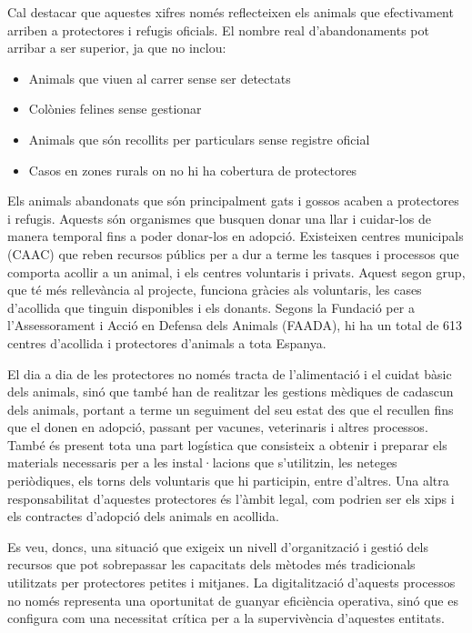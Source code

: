 \documentclass[11pt,a4paper]{report}
\begin{document}
Cal destacar que aquestes xifres només reflecteixen els animals que efectivament arriben a protectores i refugis oficials. El nombre real d'abandonaments pot arribar a ser superior, ja que no inclou:

\begin{itemize}
    \item Animals que viuen al carrer sense ser detectats
    
    \item Colònies felines sense gestionar

    \item Animals que són recollits per particulars sense registre oficial
    
    \item Casos en zones rurals on no hi ha cobertura de protectores
\end{itemize}

Els animals abandonats que són principalment gats i gossos acaben a protectores i refugis. Aquests són organismes que busquen donar una llar i cuidar-los de manera temporal fins a poder donar-los en adopció. Existeixen centres municipals (CAAC) que reben recursos públics per a dur a terme les tasques i processos que comporta acollir a un animal, i els centres voluntaris i privats. Aquest segon grup, que té més rellevància al projecte, funciona gràcies als voluntaris, les cases d’acollida que tinguin disponibles i els donants. Segons la Fundació per a l'Assessorament i Acció en Defensa dels Animals (FAADA), hi ha un total de 613 centres d’acollida i protectores d’animals \cite{faada_protectoras_nodate} a tota Espanya.

El dia a dia de les protectores no només tracta de l’alimentació i el cuidat bàsic dels animals, sinó que també han de realitzar les gestions mèdiques de cadascun dels animals, portant a terme un seguiment del seu estat des que el recullen fins que el donen en adopció, passant per vacunes, veterinaris i altres processos. També és present tota una part logística que consisteix a obtenir i preparar els materials necessaris per a les instal·lacions que s’utilitzin, les neteges periòdiques, els torns dels voluntaris que hi participin, entre d’altres.  Una altra responsabilitat d’aquestes protectores és l’àmbit legal, com podrien ser els xips i els contractes d’adopció dels animals en acollida. 

Es veu, doncs, una situació que exigeix un nivell d'organització i gestió dels recursos que pot sobrepassar les capacitats dels mètodes més tradicionals utilitzats per protectores petites i mitjanes. La digitalització d'aquests processos no només representa una oportunitat de guanyar eficiència operativa, sinó que es configura com una necessitat crítica per a la supervivència d'aquestes entitats. 
\end{document}
